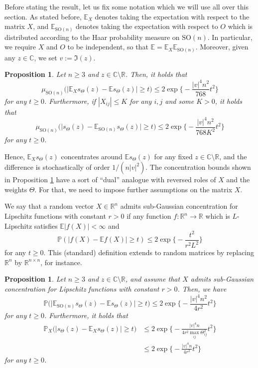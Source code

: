 \documentclass[a4paper,12pt]{amsart}
\numberwithin{equation}{section}
\newtheorem{proposition}[satz]{Proposition}
\theoremstyle{remark}
\def\E{{\mathbb E}}
\def\C{{\mathbb C}}
\def\P{{\mathbb P}}
\def\R{{\mathbb R}}
\begin{document}
Before stating the result, let us fix some notation which we will use all over this section. As stated before, $\E_X$ denotes taking the expectation with respect to the matrix $X$, and $\E_{\mathrm{SO}(n)}$ denotes taking the expectation with respect to $O$ which is distributed according to the Haar probability measure on $\mathrm{SO}(n)$. In particular, we require $X$ and $O$ to be independent, so that $\E = \E_X\E_{\mathrm{SO}(n)}$. Moreover, given any $z \in \C$, we set $v := \Im(z)$.

\begin{proposition}\label{propCoMRM}
    Let $n \ge 3$ and $z \in \C \setminus \R$. Then, it holds that
    \[
    \mu_{\mathrm{SO}(n)}\big(\big|\E_Xs_\Theta(z) - \E s_\Theta(z)\big| \ge t\big) \le 2 \exp\Big\{- \frac{|v|^4 n^2}{768} t^2\Big\}
    \]
    for any $t \ge 0$. Furthermore, if $|X_{ij}| \le K$ for any $i,j$ and some $K > 0$, it holds that
    \[
    \mu_{\mathrm{SO}(n)}\big(\big|s_\Theta(z) - \E_{\mathrm{SO}(n)} s_\Theta(z)\big| \ge t\big) \le 2 \exp\Big\{- \frac{|v|^4 n^2}{768K^2} t^2\Big\}
    \]
    for any $t \ge 0$.
\end{proposition}

Hence, $\E_X s_\Theta(z)$ concentrates around $\E s_\Theta(z)$ for any fixed $z \in \C \setminus \R$, and the difference is stochastically of order $1/(n|v|^2)$. The concentration bounds shown in Proposition \ref{propCoMRM} have a sort of ``dual'' analogue with reversed roles of $X$ and the weights $\Theta$. For that, we need to impose further assumptions on the matrix $X$.

We say that a random vector $X \in \R^n$ admits sub-Gaussian concentration for Lipschitz functions with constant $r > 0$ if any function $f \colon \R^n \to \R$ which is $L$-Lipschitz satisfies $\E|f(X)| < \infty$ and
\begin{equation}\label{eq:LSICon}
    \P(|f(X) - \E f(X)| \ge t) \le 2 \exp\Big\{- \frac{t^2}{r^2L^2}\Big\}
\end{equation}
for any $t \ge 0$. This (standard) definition extends to random matrices by replacing $\R^n$ by $\R^{n \times n}$, for instance.

\begin{proposition}\label{prop:CoMRMX}
    Let $n \ge 3$ and $z \in \C \setminus \R$, and assume that $X$ admits sub-Gaussian concentration for Lipschitz functions with constant $r> 0$. Then, we have
    \[
    \P\big(\big|\E_{\mathrm{SO}(n)}s_\Theta(z) - \E s_\Theta(z)\big| \ge t\big) \le 2 \exp\Big\{- \frac{|v|^4 n^2}{4r^2}t^2\Big\}
    \]
    for any $t \ge 0$. Furthermore, it holds that
    \begin{align*}
    \P_X\big(\big|s_\Theta(z) - \E_X s_\Theta(z)\big| \ge t\big) &\le 2 \exp\Big\{- \frac{|v|^4 n}{4r^2\max_{ij} \Theta_{ij}^2}t^2\Big\}\\
    &\le 2 \exp\Big\{- \frac{|v|^4 n}{4r^2}t^2\Big\}
    \end{align*}
    for any $t \ge 0$.
\end{proposition}
\end{document}
